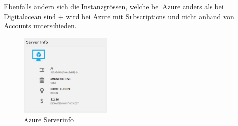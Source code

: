 Ebenfalls ändern sich die Instanzgrössen, welche bei Azure anders als bei 
Digitalocean sind + wird bei Azure mit Subscriptions und nicht anhand von 
Accounts unterschieden.


\begin{figure}[!htbp]
\centering
\includegraphics[width=0.4\textwidth]{./03_Analyse/03_Bitnami/images/azure_serverinfo}
\caption{Azure Serverinfo}
\end{figure}

